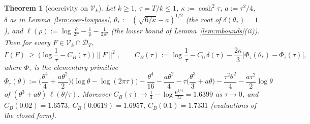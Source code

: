 \documentclass[11pt]{amsart}
\newtheorem{theorem}{Theorem}[section]
\theoremstyle{definition}
\theoremstyle{remark}
\begin{document}
\begin{theorem}[coercivity on $\mathcal V_k$]\label{thm:coer-B}
Let $k\ge1$, $\tau=T/k\le1$, $\kappa:=\cosh^2\tau$, $a:=\tau^2/4$, $\delta$ as in
Lemma~\ref{lem:coer-lowpass}, $\theta_*:=(\sqrt{6/\kappa}-a)^{1/2}$ (the root of $\delta(\theta_*)=1$), and
$\ell(\rho):=\log\frac\rho{2\pi}-\frac1\rho-\frac1{2\rho^2}$ (the lower bound of Lemma~\ref{lem:mbounds}(ii)).
Then for every $F\in\mathcal V_k\cap\mathcal D_T$,
\begin{equation}\label{eq:coer-B}
\Gamma(F)\ \ge\ \Big(\log\frac1\tau-C_B(\tau)\Big)\|F\|^2,\qquad
C_B(\tau):=\log\frac1\tau-C_0\,\delta(\tau)-\frac{2\kappa}3\big[\Phi_\tau(\theta_*)-\Phi_\tau(\tau)\big],
\end{equation}
where $\Phi_\tau$ is the elementary primitive
\[
\Phi_\tau(\theta):=\Big(\frac{\theta^4}4+\frac{a\theta^2}2\Big)\big(\log\theta-\log(2\pi\tau)\big)-\frac{\theta^4}{16}-\frac{a\theta^2}4
-\tau\Big(\frac{\theta^3}3+a\theta\Big)-\frac{\tau^2\theta^2}4-\frac{a\tau^2}2\log\theta
\]
of $(\theta^3+a\theta)\,\ell(\theta/\tau)$. Moreover $C_B(\tau)\to\frac14-\log\frac{6^{1/4}}{2\pi}=1.6399$ as
$\tau\to0$, and $C_B(0.02)=1.6573$, $C_B(0.0619)=1.6957$, $C_B(0.1)=1.7331$ (evaluations of the closed form).
\end{theorem}
\end{document}
